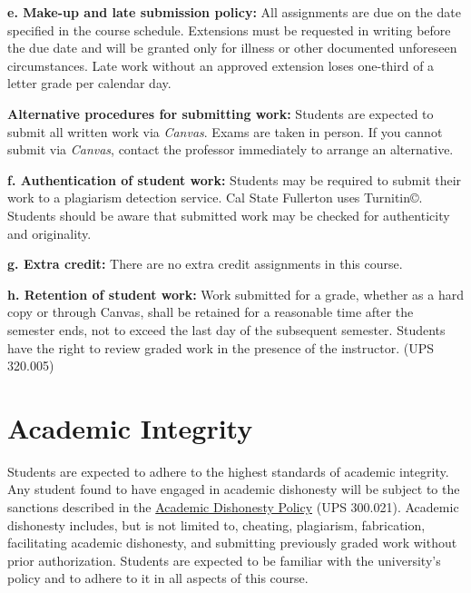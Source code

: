 \documentclass[12pt]{article}
\begin{document}
\vspace{1em}
\noindent \textbf{e. Make-up and late submission policy:}
All assignments are due on the date specified in the course schedule. Extensions must be requested in writing before the due date and will be granted only for illness or other documented unforeseen circumstances. Late work without an approved extension loses one-third of a letter grade per calendar day.

\vspace{0.5em}
\noindent \textbf{Alternative procedures for submitting work:}
Students are expected to submit all written work via \emph{Canvas}. Exams are taken in person. If you cannot submit via \emph{Canvas}, contact the professor immediately to arrange an alternative.

\vspace{1em}
\noindent \textbf{f. Authentication of student work:}
Students may be required to submit their work to a plagiarism detection service. Cal State Fullerton uses Turnitin\copyright. Students should be aware that submitted work may be checked for authenticity and originality.

\vspace{1em}
\noindent \textbf{g. Extra credit:}
There are no extra credit assignments in this course.

\vspace{1em}
\noindent \textbf{h. Retention of student work:}
Work submitted for a grade, whether as a hard copy or through Canvas, shall be retained for a reasonable time after the semester ends, not to exceed the last day of the subsequent semester. Students have the right to review graded work in the presence of the instructor. (UPS 320.005)

\section*{Academic Integrity}
Students are expected to adhere to the highest standards of academic integrity. Any student found to have engaged in academic dishonesty will be subject to the sanctions described in the \href{https://www.fullerton.edu/senate/publications_policies_resolutions/ups/UPS\%20300/UPS\%20300.021.pdf}{Academic Dishonesty Policy} (UPS 300.021). Academic dishonesty includes, but is not limited to, cheating, plagiarism, fabrication, facilitating academic dishonesty, and submitting previously graded work without prior authorization. Students are expected to be familiar with the university's policy and to adhere to it in all aspects of this course.
\end{document}
